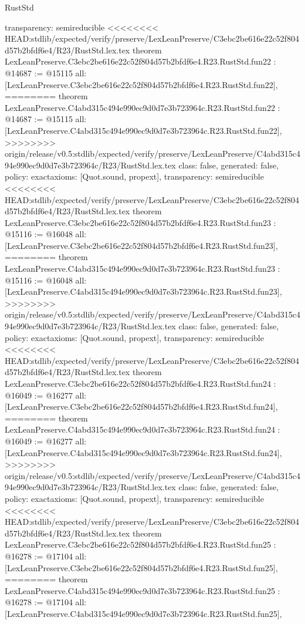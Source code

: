\begin{lexlean}{RustStd}
\begin{coremodule}
{\begin{coremodule}
{{{{{{{{{{{{{{{{{{{{{{{{{  transparency: semireducible
}
<<<<<<<< HEAD:stdlib/expected/verify/preserve/LexLeanPreserve/C3ebc2be616e22c52f804d57b2bfdf6e4/R23/RustStd.lex.tex
theorem LexLeanPreserve.C3ebc2be616e22c52f804d57b2bfdf6e4.R23.RustStd.fun22 : @14687 := @15115 {
  all: [LexLeanPreserve.C3ebc2be616e22c52f804d57b2bfdf6e4.R23.RustStd.fun22],
========
theorem LexLeanPreserve.C4abd315c494e990ec9d0d7e3b723964c.R23.RustStd.fun22 : @14687 := @15115 {
  all: [LexLeanPreserve.C4abd315c494e990ec9d0d7e3b723964c.R23.RustStd.fun22],
>>>>>>>> origin/release/v0.5:stdlib/expected/verify/preserve/LexLeanPreserve/C4abd315c494e990ec9d0d7e3b723964c/R23/RustStd.lex.tex
  class: false,
  generated: false,
  policy: exact{axioms: [Quot.sound, propext]},
  transparency: semireducible
}
<<<<<<<< HEAD:stdlib/expected/verify/preserve/LexLeanPreserve/C3ebc2be616e22c52f804d57b2bfdf6e4/R23/RustStd.lex.tex
theorem LexLeanPreserve.C3ebc2be616e22c52f804d57b2bfdf6e4.R23.RustStd.fun23 : @15116 := @16048 {
  all: [LexLeanPreserve.C3ebc2be616e22c52f804d57b2bfdf6e4.R23.RustStd.fun23],
========
theorem LexLeanPreserve.C4abd315c494e990ec9d0d7e3b723964c.R23.RustStd.fun23 : @15116 := @16048 {
  all: [LexLeanPreserve.C4abd315c494e990ec9d0d7e3b723964c.R23.RustStd.fun23],
>>>>>>>> origin/release/v0.5:stdlib/expected/verify/preserve/LexLeanPreserve/C4abd315c494e990ec9d0d7e3b723964c/R23/RustStd.lex.tex
  class: false,
  generated: false,
  policy: exact{axioms: [Quot.sound, propext]},
  transparency: semireducible
}
<<<<<<<< HEAD:stdlib/expected/verify/preserve/LexLeanPreserve/C3ebc2be616e22c52f804d57b2bfdf6e4/R23/RustStd.lex.tex
theorem LexLeanPreserve.C3ebc2be616e22c52f804d57b2bfdf6e4.R23.RustStd.fun24 : @16049 := @16277 {
  all: [LexLeanPreserve.C3ebc2be616e22c52f804d57b2bfdf6e4.R23.RustStd.fun24],
========
theorem LexLeanPreserve.C4abd315c494e990ec9d0d7e3b723964c.R23.RustStd.fun24 : @16049 := @16277 {
  all: [LexLeanPreserve.C4abd315c494e990ec9d0d7e3b723964c.R23.RustStd.fun24],
>>>>>>>> origin/release/v0.5:stdlib/expected/verify/preserve/LexLeanPreserve/C4abd315c494e990ec9d0d7e3b723964c/R23/RustStd.lex.tex
  class: false,
  generated: false,
  policy: exact{axioms: [Quot.sound, propext]},
  transparency: semireducible
}
<<<<<<<< HEAD:stdlib/expected/verify/preserve/LexLeanPreserve/C3ebc2be616e22c52f804d57b2bfdf6e4/R23/RustStd.lex.tex
theorem LexLeanPreserve.C3ebc2be616e22c52f804d57b2bfdf6e4.R23.RustStd.fun25 : @16278 := @17104 {
  all: [LexLeanPreserve.C3ebc2be616e22c52f804d57b2bfdf6e4.R23.RustStd.fun25],
========
theorem LexLeanPreserve.C4abd315c494e990ec9d0d7e3b723964c.R23.RustStd.fun25 : @16278 := @17104 {
  all: [LexLeanPreserve.C4abd315c494e990ec9d0d7e3b723964c.R23.RustStd.fun25],
}}}}}}}}}}}}}}}}}}}}}}}}}}}}}
\end{coremodule}}
\end{coremodule}
\end{lexlean}
